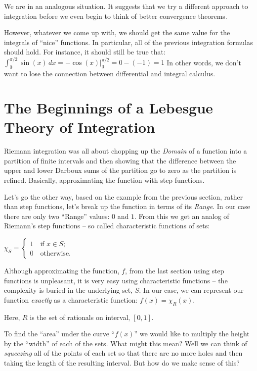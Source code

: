 \documentclass{article}
\begin{document}
We are in an analogous situation. It suggests that 
we try a different approach to integration before we even
begin to think of better convergence theorems. 

However, whatever we come up with, we should get the same value for the 
integrals of ``nice'' functions. In particular, all of the previous integration 
formulas should hold. For instance, it should still be true that: 
$\int_0^{\pi / 2} \sin(x) \, dx = -\cos(x)|_{0}^{\pi / 2} = 0 - (-1) = 1$
In other words, we don't want to lose the connection between differential and
integral calculus.


\section{The Beginnings of a Lebesgue Theory of Integration}

Riemann integration was all about chopping up the {\em Domain\/} of a function 
into a partition of finite intervals and then showing that the difference 
between the upper and lower Darboux sums of the partition 
go to zero as the partition is refined. Basically, approximating the function 
with step functions.

Let's go the other way, based on the example from the previous section, rather 
than step functions, let's break up the function in terms of its {\em Range\/}. 
In our case there are only two ``Range'' values: $0$ and $1$. From this we get an 
analog of Riemann's step functions -- 
so called characteristic functions of sets:

$\chi_{S} = \begin{cases} 1 \quad \text{if $x \in  S$;} \\ 0 \quad \text{otherwise.} \end{cases}$

Although approximating the function, $f$, from the last section using step 
functions is unpleasant, it is very easy using characteristic functions -- the complexity 
is buried in the underlying set, $S$. In our case, we can represent our function {\em exactly\/}
as a characteristic function: $f(x) = \chi_{R}(x)$.

Here, $R$ is the set of rationals on interval, $[0, 1]$.

To find the ``area'' under the curve ``$f(x)$'' we would like to multiply the 
height by the ``width'' of each of the sets. What might this mean?
Well we can think of {\em squeezing\/} all of the points of each set so that there are 
no more holes and then taking the length of the resulting interval.
But how do we make sense of this?
\end{document}

